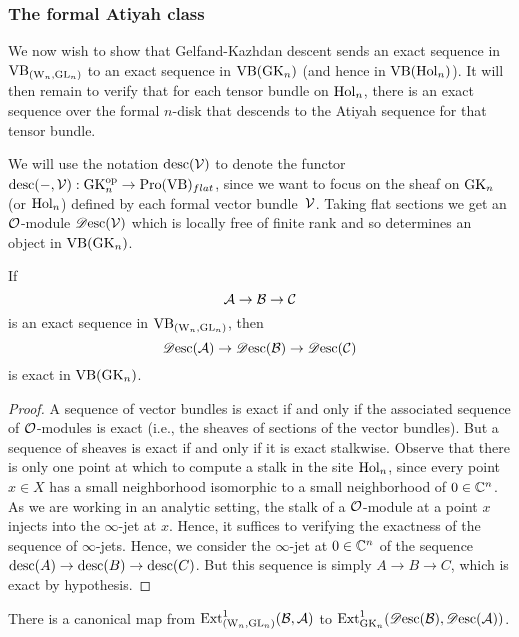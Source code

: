 \subsubsection{The formal Atiyah class}

We now wish to show that Gelfand-Kazhdan descent sends an exact sequence in ${\rm VB}_{({{\rm W}_n}, {\rm GL}_n)}$ to an exact sequence in ${\rm VB}({\rm GK}_n)$ (and hence in ${\rm VB}({\rm Hol}_n)$). 
It will then remain to verify that for each tensor bundle on ${\rm Hol}_n$, 
there is an exact sequence over the formal $n$-disk that descends to the Atiyah sequence for that tensor bundle.

We will use the notation ${\rm desc}(\mathcal{V})$ to denote the functor ${\rm desc}(-,\mathcal{V}): {\rm GK}_n^{{\rm op}} \to {\rm Pro}({\rm VB})_{flat}$, 
since we want to focus on the sheaf on ${\rm GK}_n$ (or ${\rm Hol}_n$) defined
by each formal vector bundle~$\mathcal{V}$. Taking flat sections we get an
$\mathcal O$-module $\mathscr{D}{\rm esc}(\mathcal{V})$ which is locally free of finite
rank and so determines an object in ${\rm VB}({\rm GK}_n)$. 

\begin{lem}
If $$\mathcal A \to \mathcal B \to \mathcal C$$ is an exact sequence in ${\rm VB}_{({{\rm W}_n}, {\rm GL}_n)}$, then 
$$\mathscr{D}{\rm esc}(\mathcal A) \to \mathscr{D}{\rm esc}(\mathcal B) \to \mathscr{D}{\rm esc}(\mathcal C)$$ 
is exact in ${\rm VB}({\rm GK}_n)$.
\end{lem}

\begin{proof}
A sequence of vector bundles is exact if and only if the associated
sequence of $\mathcal O$-modules is exact (i.e., the sheaves of sections of
the vector bundles). But a sequence of sheaves is exact if and only if
it is exact stalkwise. Observe that there is only one point at which
to compute a stalk in the site ${\rm Hol}_n$, since every point $x \in X$
has a small neighborhood isomorphic to a small neighborhood of $0 \in
\mathbb C^n$. As we are working in an analytic setting, the stalk of a
$\mathcal O$-module at a point $x$ injects into the $\infty$-jet at
$x$. Hence, it suffices to verifying the exactness of the sequence of
$\infty$-jets. Hence, we consider the $\infty$-jet at $0 \in \mathbb C^n$ of
the sequence ${\rm desc}(A) \to {\rm desc}(B) \to {\rm desc}(C)$. But
this sequence is simply $A \to B \to C$, which is exact by
hypothesis.
\end{proof}

\begin{cor}
There is a canonical map from ${\rm Ext}^1_{({{\rm W}_n}, {\rm GL}_n)}(\mathcal B,\mathcal A)$ to ${\rm Ext}^1_{{\rm GK}_n}(\mathscr{D}{\rm esc}(\mathcal B), \mathscr{D}{\rm esc}(\mathcal A))$.
\end{cor}

